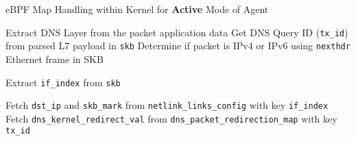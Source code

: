 \documentclass [11pt, proquest] {uwthesis}[2020/02/24]
\begin{document}
\begin{algorithm}[H]
\caption{eBPF Map Handling within Kernel for \textbf{Active} Mode of Agent}
\label{sec:alg2}

\small
{}



Extract DNS Layer from the packet application data\;
Get DNS Query ID (\texttt{tx\_id}) from parsed L7 payload in \texttt{skb}\;
Determine if packet is IPv4 or IPv6 using \texttt{nexthdr} Ethernet frame in SKB

Extract \texttt{if\_index} from \texttt{skb}\;

Fetch \texttt{dst\_ip} and \texttt{skb\_mark} from \texttt{netlink\_links\_config} with key \texttt{if\_index}\;
Fetch \texttt{dns\_kernel\_redirect\_val} from \texttt{dns\_packet\_redirection\_map} with key \texttt{tx\_id}\;


\end{algorithm}
\end{document}
